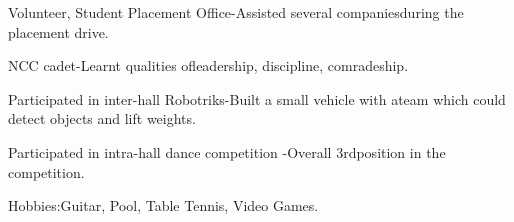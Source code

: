 

\begin{cventries}

  \cventry
  {}
  {}
  {}
  {}
  {
    \begin{cvitems}
    \item   Volunteer, Student Placement Office-Assisted several companiesduring the placement drive.                           
    \item   NCC cadet-Learnt qualities ofleadership, discipline, comradeship.                                                   
    \item   Participated in inter-hall Robotriks-Built a small vehicle with ateam which could detect objects and lift weights.   
    \item   Participated in intra-hall dance competition -Overall 3rdposition in the competition.                               
    \item   Hobbies:Guitar, Pool, Table Tennis, Video Games.
    \end{cvitems}
  }
  \cventry
 
\end{cventries}

